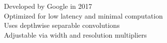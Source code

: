\documentclass[preview]{standalone}
\begin{document}
Developed by Google in 2017\\Optimized for low latency and minimal computation\\Uses depthwise separable convolutions\\Adjustable via width and resolution multipliers\\
\end{document}
